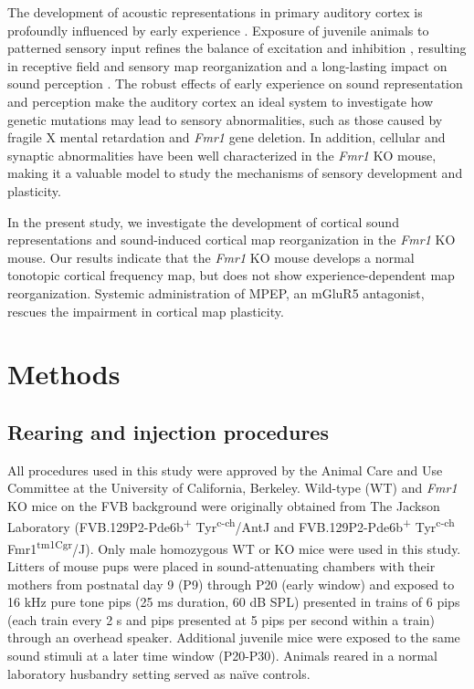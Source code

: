 The development of acoustic representations in primary auditory cortex is profoundly influenced by early experience \cite{Zhang2001, DeVillers-Sidani2007, Insanally2009, Popescu2010a}. Exposure of juvenile animals to patterned sensory input refines the balance of excitation and inhibition \cite{Dorrn2010, Sun2010}, resulting in receptive field and sensory map reorganization and a long-lasting impact on sound perception \cite{Han2007}. The robust effects of early experience on sound representation and perception make the auditory cortex an ideal system to investigate how genetic mutations may lead to sensory abnormalities, such as those caused by fragile X mental retardation and \textit{Fmr1} gene deletion. In addition, cellular and synaptic abnormalities have been well characterized in the \textit{Fmr1} KO mouse, making it a valuable model to study the mechanisms of sensory development and plasticity.

In the present study, we investigate the development of cortical sound representations and sound-induced cortical map reorganization in the \textit{Fmr1} KO mouse. Our results indicate that the \textit{Fmr1} KO mouse develops a normal tonotopic cortical frequency map, but does not show experience-dependent map reorganization. Systemic administration of MPEP, an mGluR5 antagonist, rescues the impairment in cortical map plasticity.

\section{Methods}

\subsection{Rearing and injection procedures}

All procedures used in this study were approved by the Animal Care and Use Committee at the University of California, Berkeley. Wild-type (WT) and \textit{Fmr1} KO mice on the FVB background were originally obtained from The Jackson Laboratory (FVB.129P2-Pde6b\textsuperscript{+} Tyr\textsuperscript{c-ch}/AntJ and FVB.129P2-Pde6b\textsuperscript{+} Tyr\textsuperscript{c-ch} Fmr1\textsuperscript{tm1Cgr}/J). Only male homozygous WT or KO mice were used in this study. Litters of mouse pups were placed in sound-attenuating chambers with their mothers from postnatal day 9 (P9) through P20 (early window) and exposed to 16 kHz pure tone pips (25 ms duration, 60 dB SPL) presented in trains of 6 pips (each train every 2 s and pips presented at 5 pips per second within a train) through an overhead speaker. Additional juvenile mice were exposed to the same sound stimuli at a later time window (P20-P30). Animals reared in a normal laboratory husbandry setting served as na\"ive controls.

